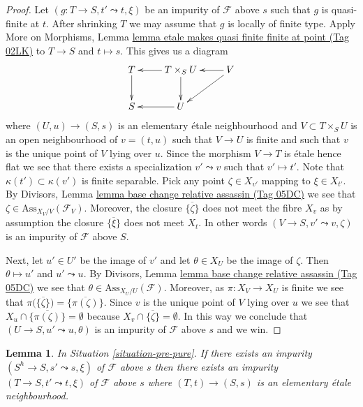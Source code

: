 \documentclass{amsart}
\theoremstyle{plain}
\newtheorem{lemma}[subsection]{Lemma}
\theoremstyle{definition}
\theoremstyle{remark}
\numberwithin{equation}{subsection}
\begin{document}
\begin{proof}
Let $(g : T \to S, t' \leadsto t, \xi)$ be an impurity of
$\mathcal{F}$ above $s$ such that $g$ is quasi-finite at $t$.
After shrinking $T$ we may assume that $g$ is locally of finite type.
Apply
More on Morphisms,
Lemma \href{https://stacks.math.columbia.edu/tag/02LK}{lemma etale makes quasi finite finite at point (Tag 02LK)}
to $T \to S$ and $t \mapsto s$. This gives us a diagram
$$
\xymatrix{
T \ar[d] & T \times_S U \ar[l] \ar[d] & V \ar[l] \ar[ld] \\
S & U \ar[l]
}
$$
where $(U, u) \to (S, s)$ is an elementary \'etale neighbourhood
and $V \subset T \times_S U$ is an open neighbourhood of $v = (t, u)$
such that $V \to U$ is finite and such that $v$ is the unique point of $V$
lying over $u$. Since the morphism $V \to T$ is \'etale
hence flat we see that there exists a specialization $v' \leadsto v$ such
that $v' \mapsto t'$. Note that $\kappa(t') \subset \kappa(v')$
is finite separable. Pick any point $\zeta \in X_{v'}$ mapping to
$\xi \in X_{t'}$. By
Divisors, Lemma \href{https://stacks.math.columbia.edu/tag/05DC}{lemma base change relative assassin (Tag 05DC)}
we see that $\zeta \in \text{Ass}_{X_V/V}(\mathcal{F}_V)$.
Moreover, the closure $\overline{\{\zeta\}}$ does not meet
the fibre $X_v$ as by assumption the closure $\overline{\{\xi\}}$
does not meet $X_t$. In other words $(V \to S, v' \leadsto v, \zeta)$
is an impurity of $\mathcal{F}$ above $S$.

\medskip\noindent
Next, let $u' \in U'$ be the image of $v'$ and let
$\theta \in X_U$ be the image of $\zeta$.
Then $\theta \mapsto u'$ and $u' \leadsto u$.
By
Divisors, Lemma \href{https://stacks.math.columbia.edu/tag/05DC}{lemma base change relative assassin (Tag 05DC)}
we see that $\theta \in \text{Ass}_{X_U/U}(\mathcal{F})$.
Moreover, as $\pi : X_V \to X_U$ is finite we see that
$\pi\big(\overline{\{\zeta\}}\big) = \overline{\{\pi(\zeta)\}}$. Since
$v$ is the unique point of $V$ lying over $u$ we see that
$X_u \cap \overline{\{\pi(\zeta)\}} = \emptyset$ because
$X_v \cap \overline{\{\zeta\}} = \emptyset$. In this way we conclude that
$(U \to S, u' \leadsto u, \theta)$ is an impurity of
$\mathcal{F}$ above $s$ and we win.
\end{proof}


\begin{lemma}
\label{lemma-impurity-on-henselization}
In Situation \ref{situation-pre-pure}.
If there exists an impurity $(S^h \to S, s' \leadsto s, \xi)$
of $\mathcal{F}$ above $s$ then there exists an impurity
$(T \to S, t' \leadsto t, \xi)$ of $\mathcal{F}$ above $s$
where $(T, t) \to (S, s)$ is an elementary \'etale neighbourhood.
\end{lemma}
\end{document}
